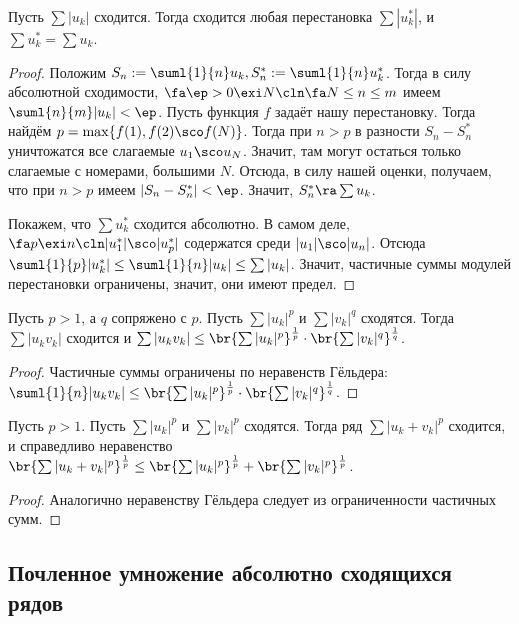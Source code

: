 \documentclass[a4paper]{article}
\begin{document}
\begin{theorem}
Пусть $\sum |u_k|$ сходится. Тогда сходится любая перестановка $\sum |u_k^*|$, и $\sum u_k^* =\sum u_k$.
\end{theorem}
\begin{proof}
Положим $S_n := \suml{1}{n} u_k, S^*_n := \suml{1}{n} u_k^*$. Тогда в силу абсолютной сходимости, $\fa \ep > 0 \exi N\cln
\fa N \le n \le m$ имеем
$\suml{n}{m}|u_k| < \ep$. Пусть функция $f$ задаёт нашу перестановку. Тогда найдём $p = \max \{ f(1), f(2)\sco f(N) \}$. Тогда при
$n>p$ в разности $S_n - S_n^*$ уничтожатся все слагаемые $u_1\sco u_N$. Значит, там могут остаться только слагаемые с номерами, большими $N$.
Отсюда, в силу нашей оценки, получаем, что при $n>p$ имеем $|S_n-S_n^*| < \ep$. Значит, $S_n^*\ra \sum u_k$.

Покажем, что $\sum u_k^*$ сходится абсолютно. В самом деле, $\fa p \exi n\cln |u_1^*|\sco |u_p^*|$
содержатся среди $|u_1|\sco |u_n|$. Отсюда $\suml{1}{p}|u_k^*| \le \suml{1}{n}|u_k| \le \sum |u_k|$. Значит, частичные суммы
модулей перестановки ограничены, значит, они имеют предел.
\end{proof}

\begin{theorem}
Пусть $p>1$, а $q$ сопряжено с $p$. Пусть $\sum |u_k|^p$ и $\sum |v_k|^q$ сходятся. Тогда $\sum |u_kv_k|$ сходится
и $\sum |u_kv_k| \le \br{\sum|u_k|^p}^{\frac{1}{p}} \cdot \br{\sum|v_k|^q} ^{\frac{1}{q}}$.
\end{theorem}
\begin{proof}
Частичные суммы ограничены по неравенств Гёльдера: $\suml{1}{n} |u_kv_k| \le \br{ \sum|u_k|^p }^{\frac{1}{p}}
\cdot \br{ \sum|v_k|^q} ^{\frac{1}{q}}$.
\end{proof}

\begin{theorem}
Пусть $p>1$. Пусть $\sum |u_k|^p$ и $\sum |v_k|^p$ сходятся. Тогда ряд
$\sum |u_k+v_k|^p$ сходится, и справедливо неравенство $\br{\sum |u_k+v_k|^p}^\frac{1}{p} \le \br{\sum |u_k|^p}^{\frac{1}{p}}
+ \br{\sum |v_k|^p}^{\frac{1}{p}}$.
\end{theorem}
\begin{proof}
Аналогично неравенству Гёльдера следует из ограниченности частичных сумм.
\end{proof}


\subsection{Почленное умножение абсолютно сходящихся рядов}
\end{document}
